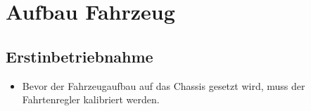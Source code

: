 

\chapter{Aufbau Fahrzeug}


\section{Erstinbetriebnahme}

\begin{itemize}
	\item Bevor der Fahrzeugaufbau auf das Chassis gesetzt wird, muss der Fahrtenregler kalibriert werden.
\end{itemize}

